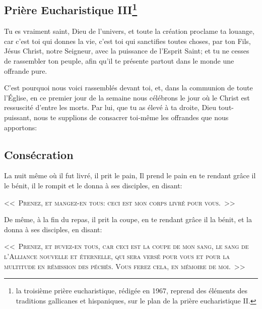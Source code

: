 \subsection*{Prière Eucharistique III\footnote{la troisième prière eucharistique, rédigée en 1967, reprend des 
éléments des traditions gallicanes et hispaniques, sur le plan de la 
prière eucharistique II.}}\label{pe3}

Tu es vraiment saint, Dieu de l'univers,
et toute la création proclame ta louange,
car c'est toi qui donnes la vie,
c'est toi qui sanctifies toutes choses,
par ton Fils, Jésus Christ, notre Seigneur,
avec la puissance de l'Esprit Saint;
et tu ne cesses de rassembler ton peuple,
afin qu'il te présente
partout dans le monde
une offrande pure.


C'est pourquoi nous voici rassemblés devant toi,
et, dans la communion de toute l'Église,
en ce premier jour de la semaine
nous célébrons le jour
où le Christ est ressuscité d'entre les morts.
Par lui, que tu as élevé à ta droite,
Dieu tout-puissant, nous te supplions
de consacrer toi-même
les offrandes que nous apportons:

\subsection*{Consécration}

La nuit même où il fut livré, il prit le pain, Il prend le pain
en te rendant grâce il le bénit, il le rompit
et le donna à ses disciples, en disant:

\textsc{<<~Prenez, et mangez-en tous:} 
\textsc{ceci est mon corps livré pour vous.~>>}


De même, à la fin du repas,
il prit la coupe, 
en te rendant grâce il la bénit,
et la donna à ses disciples, en disant:

\textsc{<<~Prenez, et buvez-en tous,} 
\textsc{car ceci est la coupe de mon sang,
le sang de l'Alliance nouvelle et éternelle,
qui sera versé
pour vous et pour la multitude
en rémission des péchés.
Vous ferez cela, en mémoire de moi.~>>}


